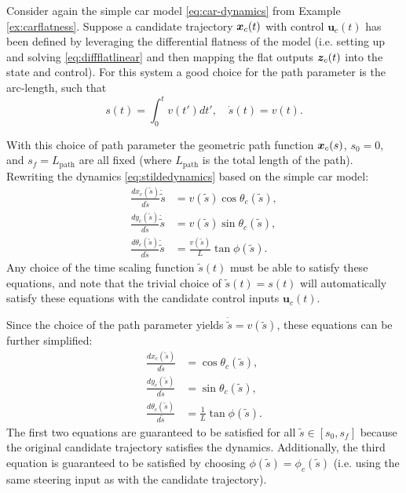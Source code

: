 \begin{example}
\theoremstyle{definition} Consider again the simple car model \eqref{eq:car-dynamics} from Example \ref{ex:carflatness}. Suppose a candidate trajectory $\bm{x}_c(t)$ with control $\bm{u}_c(t)$ has been defined by leveraging the differential flatness of the model (i.e. setting up and solving \eqref{eq:diffflatlinear} and then mapping the flat outputs $\bm{z}_c(t)$ into the state and control). For this system a good choice for the path parameter is the arc-length, such that
\begin{equation*}
    s(t) = \int_0^t v(t') dt', \quad \dot{s}(t) = v(t).
\end{equation*}

With this choice of path parameter the geometric path function $\bm{x}_c(s)$, $s_0 = 0$, and $s_f = L_{\text{path}}$ are all fixed (where $L_{\text{path}}$ is the total length of the path). Rewriting the dynamics \eqref{eq:stildedynamics} based on the simple car model:
\begin{equation*}
\begin{split}
\frac{dx_c(\tilde{s})}{d\tilde{s}}\dot{\tilde{s}} &= v(\tilde{s})\cos\theta_c(\tilde{s}),\\
\frac{dy_c(\tilde{s})}{d\tilde{s}}\dot{\tilde{s}}&= v(\tilde{s})\sin\theta_c(\tilde{s}),\\
\frac{d\theta_c(\tilde{s})}{d\tilde{s}}\dot{\tilde{s}} &= \frac{v(\tilde{s})}{L}\tan\phi(\tilde{s}).
\end{split}
\end{equation*}
Any choice of the time scaling function $\tilde{s}(t)$ must be able to satisfy these equations, and note that the trivial choice of $\tilde{s}(t) = s(t)$ will automatically satisfy these equations with the candidate control inputs $\bm{u}_c(t)$. 

Since the choice of the path parameter yields $\dot{\tilde{s}} = v(\tilde{s})$, these equations can be further simplified:
\begin{equation*}
\begin{split}
\frac{dx_c(\tilde{s})}{d\tilde{s}} &= \cos\theta_c(\tilde{s}),\\
\frac{dy_c(\tilde{s})}{d\tilde{s}}&= \sin\theta_c(\tilde{s}),\\
\frac{d\theta_c(\tilde{s})}{d\tilde{s}} &= \frac{1}{L}\tan\phi(\tilde{s}).
\end{split}
\end{equation*}
The first two equations are guaranteed to be satisfied for all $\tilde{s} \in [s_0, s_f]$ because the original candidate trajectory satisfies the dynamics. Additionally, the third equation is guaranteed to be satisfied by choosing $\phi(\tilde{s}) = \phi_c(\tilde{s})$ (i.e. using the same steering input as with the candidate trajectory).


\end{example}
